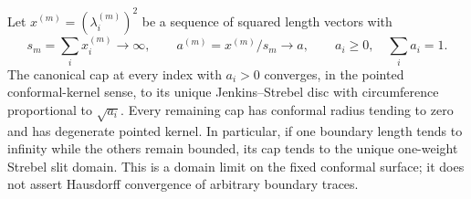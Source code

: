 \begin{theorem}
\label{C:A2b-strebel-limit}
Let $x^{(m)}=(\lambda_i^{(m)})^2$ be a sequence of squared length vectors with
\[
 s_m=\sum_i x_i^{(m)}\longrightarrow\infty,
 \qquad a^{(m)}=x^{(m)}/s_m\longrightarrow a,
 \qquad a_i\geq0,\quad\sum_i a_i=1.
\]
The canonical cap at every index with $a_i>0$ converges, in the pointed conformal-kernel sense, to its unique Jenkins--Strebel disc with circumference proportional to $\sqrt{a_i}$. Every remaining cap has conformal radius tending to zero and has degenerate pointed kernel. In particular, if one boundary length tends to infinity while the others remain bounded, its cap tends to the unique one-weight Strebel slit domain. This is a domain limit on the fixed conformal surface; it does not assert Hausdorff convergence of arbitrary boundary traces.
\end{theorem}
